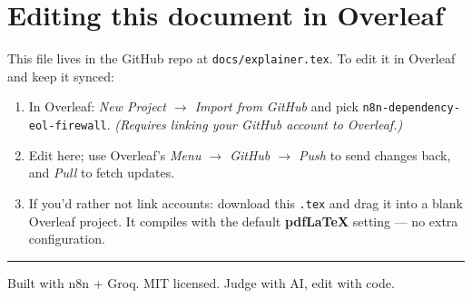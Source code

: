\documentclass[11pt,a4paper]{article}
\begin{document}
\section{Editing this document in Overleaf}

This file lives in the GitHub repo at \texttt{docs/explainer.tex}. To edit it in Overleaf and keep it
synced:

\begin{enumerate}[leftmargin=1.5em]
  \item In Overleaf: \emph{New Project $\rightarrow$ Import from GitHub} and pick
    \texttt{n8n-dependency-eol-firewall}. \emph{(Requires linking your GitHub account to Overleaf.)}
  \item Edit here; use Overleaf's \emph{Menu $\rightarrow$ GitHub $\rightarrow$ Push} to send changes back,
    and \emph{Pull} to fetch updates.
  \item If you'd rather not link accounts: download this \texttt{.tex} and drag it into a blank Overleaf
    project. It compiles with the default \textbf{pdfLaTeX} setting --- no extra configuration.
\end{enumerate}

\vspace{10pt}
\hrule
\vspace{6pt}
\begin{center}
\small\color{ink} Built with n8n + Groq. MIT licensed. Judge with AI, edit with code.
\end{center}
\end{document}
